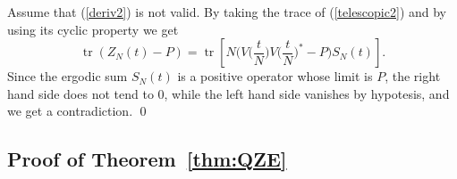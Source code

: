 \documentclass[aip,jmp
]{revtex4}
\newcommand{\tr}{\mathop{\mathrm{tr}}\nolimits}
\theoremstyle{definition}
\begin{document}
Assume that (\ref{deriv2}) is not valid. By taking the trace of (\ref{telescopic2}) and by using its cyclic property we get
\begin{equation*}
\tr(Z_N(t)-P )
=   \tr \left[ N\Big(
V\Big(\frac{t}{N}\Big) V\Big(\frac{t}{N}\Big)^* - P \Big) S_N(t) \right].
\end{equation*}
Since the ergodic sum $S_N(t)$ is a positive operator whose limit is $P$, the right hand side does not tend to 0, while the left hand side vanishes by hypotesis, and we get a contradiction.
\qed





\subsection*{Proof of Theorem~\ref{thm:QZE}}
\end{document}
